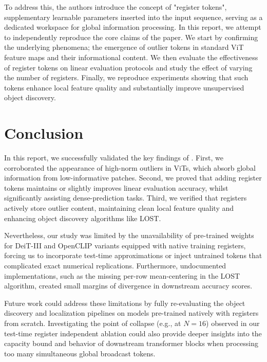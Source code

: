 \documentclass[10pt]{article} %
\begin{document}
To address this, the authors introduce the concept of "register tokens", supplementary learnable parameters inserted into the input sequence, serving as a dedicated workspace for global information processing. In this report, we attempt to independently reproduce the core claims of the paper. We start by confirming the underlying phenomena; the emergence of outlier tokens in standard ViT feature maps and their informational content. We then evaluate the effectiveness of register tokens on linear evaluation protocols and study the effect of varying the number of registers. Finally, we reproduce experiments showing that such tokens enhance local feature quality and substantially improve unsupervised object discovery.


\label{sec:claims}







\section{Conclusion}
In this report, we successfully validated the key findings of \citet{darcet2024vision}. First, we corroborated the appearance of high-norm outliers in ViTs, which absorb global information from low-informative patches. Second, we proved that adding register tokens maintains or slightly improves linear evaluation accuracy, whilst significantly assisting dense-prediction tasks. Third, we verified that registers actively store outlier content, maintaining clean local feature quality and enhancing object discovery algorithms like LOST. 

Nevertheless, our study was limited by the unavailability of pre-trained weights for DeiT-III and OpenCLIP variants equipped with native training registers, forcing us to incorporate test-time approximations or inject untrained tokens that complicated exact numerical replications. Furthermore, undocumented implementations, such as the missing per-row mean-centering in the LOST algorithm, created small margins of divergence in downstream accuracy scores. 

Future work could address these limitations by fully re-evaluating the object discovery and localization pipelines on models pre-trained natively with registers from scratch. Investigating the point of collapse (e.g., at $N=16$) observed in our test-time register independent ablation could also provide deeper insights into the capacity bound and behavior of downstream transformer blocks when processing too many simultaneous global broadcast tokens.
\end{document}
